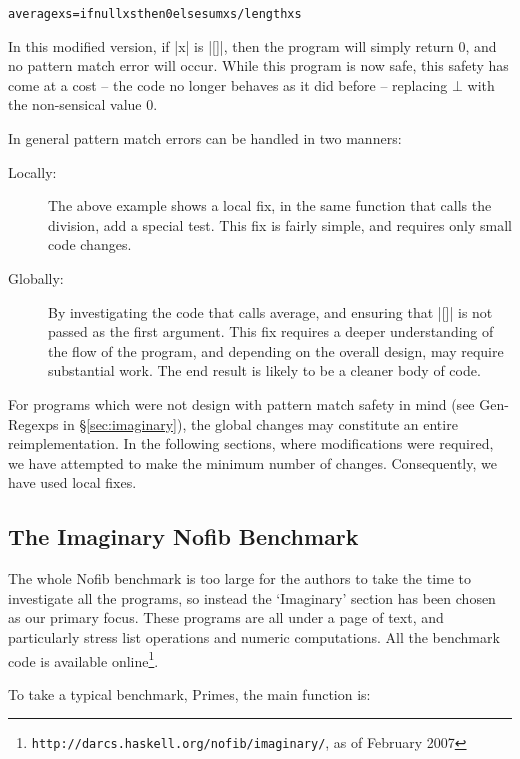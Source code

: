 \documentclass[preprint]{sigplanconf}
\newcommand{\C}[1]{\textsf{#1}}
\newenvironment{code}{\begin{alltt}\small}{\end{alltt}}
\begin{document}
\begin{code}
average xs = if null xs then 0 else sum xs / length xs
\end{code}

In this modified version, if |x| is |[]|, then the program will simply return 0, and no pattern match error will occur. While this program is now safe, this safety has come at a cost -- the code no longer behaves as it did before -- replacing $\bot{}$ with the non-sensical value 0.

In general pattern match errors can be handled in two manners:

\begin{description}
\item [Locally:] The above example shows a local fix, in the same function that calls the division, add a special test. This fix is fairly simple, and requires only small code changes.

\item [Globally:] By investigating the code that calls \C{average}, and ensuring that |[]| is not passed as the first argument. This fix requires a deeper understanding of the flow of the program, and depending on the overall design, may require substantial work. The end result is likely to be a cleaner body of code.
\end{description}

For programs which were not design with pattern match safety in mind (see Gen-Regexps in \S\ref{sec:imaginary}), the global changes may constitute an entire reimplementation. In the following sections, where modifications were required, we have attempted to make the minimum number of changes. Consequently, we have used local fixes.

\subsection{The Imaginary Nofib Benchmark}

The whole Nofib benchmark \citep{nofib} is too large for the authors to take the time to investigate all the programs, so instead the `Imaginary' section has been chosen as our primary focus. These programs are all under a page of text, and particularly stress list operations and numeric computations. All the benchmark code is available online\footnote{\texttt{http://darcs.haskell.org/nofib/imaginary/}, as of February 2007}.

To take a typical benchmark, Primes, the \C{main} function is:
\end{document}
